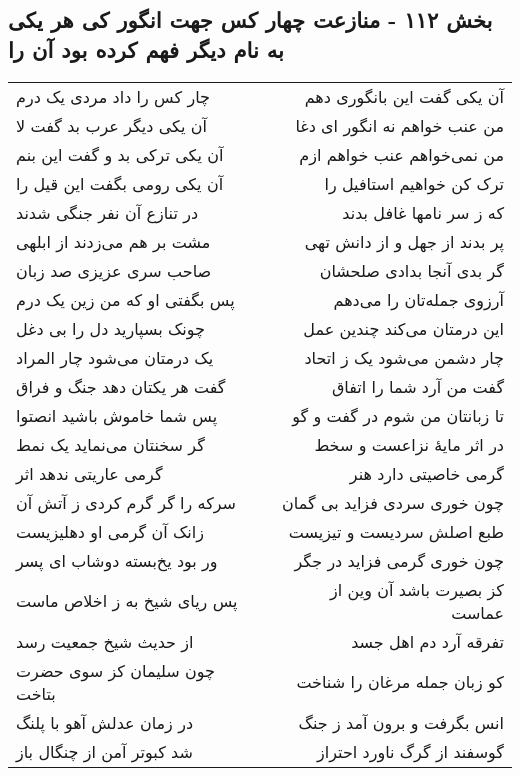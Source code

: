 \begin{center}
\section*{بخش ۱۱۲ - منازعت چهار کس جهت انگور کی هر یکی به نام دیگر فهم کرده بود آن را}
\label{sec:sh112}
\begin{longtable}{l p{0.5cm} r}
چار کس را داد مردی یک درم
&&
آن یکی گفت این بانگوری دهم
\\
آن یکی دیگر عرب بد گفت لا
&&
من عنب خواهم نه انگور ای دغا
\\
آن یکی ترکی بد و گفت این بنم
&&
من نمی‌خواهم عنب خواهم ازم
\\
آن یکی رومی بگفت این قیل را
&&
ترک کن خواهیم استافیل را
\\
در تنازع آن نفر جنگی شدند
&&
که ز سر نامها غافل بدند
\\
مشت بر هم می‌زدند از ابلهی
&&
پر بدند از جهل و از دانش تهی
\\
صاحب سری عزیزی صد زبان
&&
گر بدی آنجا بدادی صلحشان
\\
پس بگفتی او که من زین یک درم
&&
آرزوی جمله‌تان را می‌دهم
\\
چونک بسپارید دل را بی دغل
&&
این درمتان می‌کند چندین عمل
\\
یک درمتان می‌شود چار المراد
&&
چار دشمن می‌شود یک ز اتحاد
\\
گفت هر یکتان دهد جنگ و فراق
&&
گفت من آرد شما را اتفاق
\\
پس شما خاموش باشید انصتوا
&&
تا زبانتان من شوم در گفت و گو
\\
گر سخنتان می‌نماید یک نمط
&&
در اثر مایهٔ نزاعست و سخط
\\
گرمی عاریتی ندهد اثر
&&
گرمی خاصیتی دارد هنر
\\
سرکه را گر گرم کردی ز آتش آن
&&
چون خوری سردی فزاید بی گمان
\\
زانک آن گرمی او دهلیزیست
&&
طبع اصلش سردیست و تیزیست
\\
ور بود یخ‌بسته دوشاب ای پسر
&&
چون خوری گرمی فزاید در جگر
\\
پس ریای شیخ به ز اخلاص ماست
&&
کز بصیرت باشد آن وین از عماست
\\
از حدیث شیخ جمعیت رسد
&&
تفرقه آرد دم اهل جسد
\\
چون سلیمان کز سوی حضرت بتاخت
&&
کو زبان جمله مرغان را شناخت
\\
در زمان عدلش آهو با پلنگ
&&
انس بگرفت و برون آمد ز جنگ
\\
شد کبوتر آمن از چنگال باز
&&
گوسفند از گرگ ناورد احتراز
\\

\end{longtable}
\end{center}
